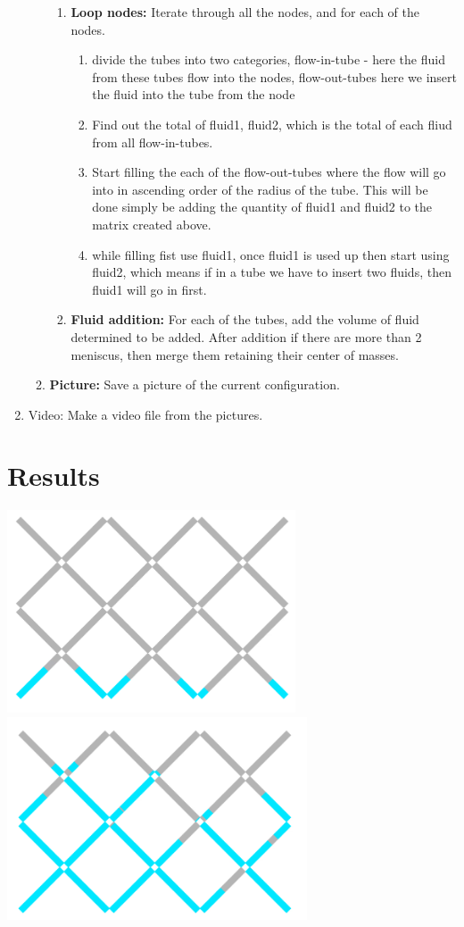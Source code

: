 \documentclass[12pt]{report}
\begin{document}
\begin{enumerate}
\begin{enumerate}
\begin{enumerate}
				\item \textbf{Loop nodes:} Iterate through all the nodes, and for each of the nodes. 
					\begin{enumerate}
						\item divide the tubes into two categories, flow-in-tube - here the fluid from these tubes flow into the nodes, flow-out-tubes here we insert the fluid into the tube from the node
						\item Find out the total of fluid1, fluid2, which is the total of each fliud from all flow-in-tubes.
						\item Start filling the each of the flow-out-tubes where the flow will go into in ascending order of the radius of the tube. This will be done simply be adding the quantity of fluid1 and fluid2 to the matrix created above.
						\item while filling fist use fluid1, once fluid1 is used up then start using fluid2, which means if in a tube we have to insert two fluids, then fluid1 will go in first.
					\end{enumerate}
				\item \textbf{Fluid addition:} For each of the tubes, add the volume of fluid determined to be added. After addition if there are more than 2 meniscus, then merge them retaining their center of masses.
				\end{enumerate}
			\item \textbf{Picture:} Save a picture of the current configuration.
			\end{enumerate}
		\item {Video:} Make a video file from the pictures.
	\end{enumerate}

\section{Results}
	\includegraphics[height=6cm]{fig_initial-fill-distribution}
	\includegraphics[height=6cm]{fig_final-fill-distribution}
	
\end{document}
